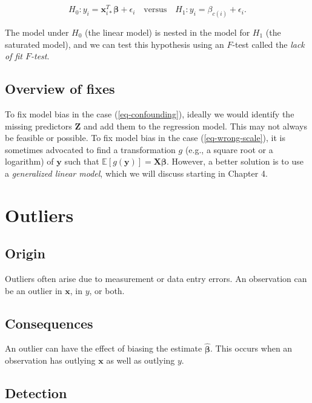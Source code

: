 \documentclass[
  11pt,
  letterpaper,
  oneside]{book}
\theoremstyle{definition}
\theoremstyle{plain}
\theoremstyle{plain}
\theoremstyle{plain}
\theoremstyle{remark}
\begin{document}
\[
H_0: y_i = \boldsymbol{x}_{i*}^T \boldsymbol{\beta} + \epsilon_i \quad \text{versus} \quad H_1: y_i = \beta_{c(i)} + \epsilon_i.
\]

The model under \(H_0\) (the linear model) is nested in the model for
\(H_1\) (the saturated model), and we can test this hypothesis using an
\(F\)-test called the \emph{lack of fit \(F\)-test}.

\hypertarget{overview-of-fixes}{%
\subsection{Overview of fixes}\label{overview-of-fixes}}

To fix model bias in the case (\ref{eq-confounding}), ideally we would
identify the missing predictors \(\boldsymbol{Z}\) and add them to the
regression model. This may not always be feasible or possible. To fix
model bias in the case (\ref{eq-wrong-scale}), it is sometimes advocated
to find a transformation \(g\) (e.g., a square root or a logarithm) of
\(\boldsymbol{y}\) such that
\(\mathbb{E}[g(\boldsymbol{y})] = \boldsymbol{X} \boldsymbol{\beta}\).
However, a better solution is to use a \emph{generalized linear model},
which we will discuss starting in Chapter 4.

\hypertarget{sec-outliers}{%
\section{Outliers}\label{sec-outliers}}

\hypertarget{origin-3}{%
\subsection{Origin}\label{origin-3}}

Outliers often arise due to measurement or data entry errors. An
observation can be an outlier in \(\boldsymbol{x}\), in \(y\), or both.

\hypertarget{consequences-3}{%
\subsection{Consequences}\label{consequences-3}}

An outlier can have the effect of biasing the estimate
\(\boldsymbol{\widehat{\beta}}\). This occurs when an observation has
outlying \(\boldsymbol{x}\) as well as outlying \(y\).

\hypertarget{detection-3}{%
\subsection{Detection}\label{detection-3}}
\end{document}
